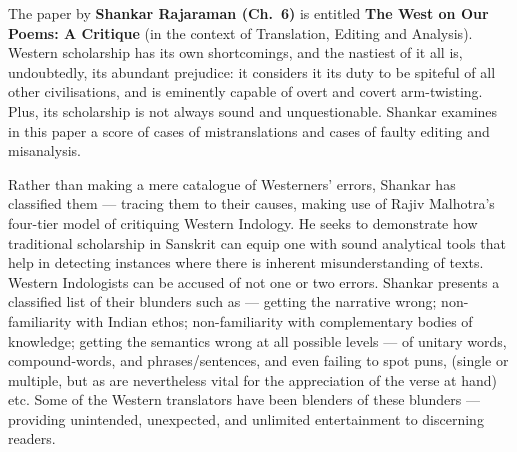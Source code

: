 The paper by {\bf Shankar Rajaraman (Ch.~6)} is entitled {\bf The West on Our Poems: A Critique} (in the context of Translation, Editing and Analysis). Western scholarship has its own shortcomings, and the nastiest of it all is, undoubtedly, its abundant prejudice: it considers it its duty to be spiteful of all other civilisations, and is eminently capable of overt and covert arm-twisting. Plus, its scholarship is not always sound and unquestionable. Shankar examines in this paper a score of cases of mistranslations and cases of faulty editing and misanalysis. 

Rather than making a mere catalogue of Westerners’ errors, Shankar has classified them --- tracing them to their causes, making use of Rajiv Malhotra’s four-tier model of critiquing Western Indology. He seeks to demonstrate how traditional scholarship in Sanskrit can equip one with sound analytical tools that help in detecting instances where there is inherent misunderstanding of texts. Western Indologists can be accused of not one or two errors. Shankar presents a classified list of their blunders such as --- getting the narrative wrong; \hbox{non-familiarity} with Indian ethos; non-familiarity with complementary bodies of knowledge; getting the semantics wrong at all possible levels --- of unitary words, compound-words, and phrases/sentences, and even failing to spot puns, (single or multiple, but as are nevertheless vital for the appreciation of the verse at hand) etc. Some of the Western translators have been blenders of these blunders --- providing unintended, unexpected, and unlimited entertainment to discerning readers. 

